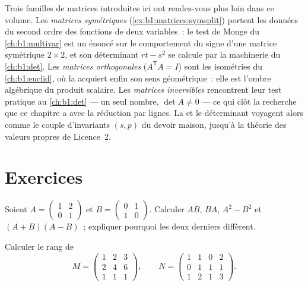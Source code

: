 \begin{remark}
\label{rem:b1:matrices:perspectives}
Trois familles de matrices introduites ici ont rendez-vous plus loin
dans ce volume. Les \emph{matrices symétriques}
(\cref{ex:b1:matrices:symsplit}) portent les données du second ordre
des fonctions de deux variables~: le test de Monge du
\cref{ch:b1:multivar} est un énoncé sur le comportement du signe d'une
matrice symétrique $2\times2$, et son déterminant $rt - s^2$
se calcule par la machinerie du \cref{ch:b1:det}. Les \emph{matrices
orthogonales} ($A^{\mathsf T}A = I$) sont les isométries du
\cref{ch:b1:euclid}, où la  acquiert enfin son sens
géométrique~: elle est l'ombre algébrique du produit scalaire. Les
\emph{matrices inversibles} rencontrent leur test pratique au
\cref{ch:b1:det} --- un seul nombre, $\det A \neq 0$ --- ce qui clôt
la recherche que ce chapitre a  avec la réduction par lignes. La
 et le déterminant voyagent alors comme le couple d'invariants
$(s, p)$ du devoir maison, jusqu'à la théorie des valeurs propres de
Licence~2.
\end{remark}

\section{Exercices}

\begin{exercise}[$\star$]\label{exo:b1:matrices:1}
Soient $A = \begin{pmatrix} 1 & 2 \\ 0 & 1 \end{pmatrix}$ et $B =
\begin{pmatrix} 0 & 1 \\ 1 & 0\end{pmatrix}$. Calculer $AB$, $BA$,
$A^2 - B^2$ et $(A+B)(A-B)$~; expliquer pourquoi les deux derniers
diffèrent.
\end{exercise}

\begin{exercise}[$\star$]\label{exo:b1:matrices:2}
Calculer le rang de
\[
M = \begin{pmatrix}
1 & 2 & 3\\
2 & 4 & 6\\
1 & 1 & 1
\end{pmatrix},
\qquad
N = \begin{pmatrix}
1 & 1 & 0 & 2\\
0 & 1 & 1 & 1\\
1 & 2 & 1 & 3
\end{pmatrix}.
\]
\end{exercise}

